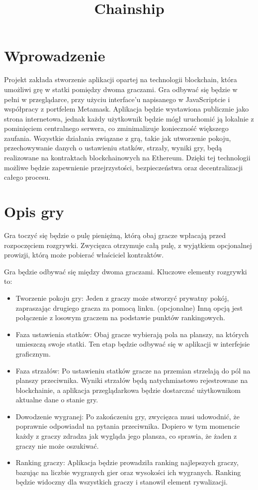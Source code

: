 \documentclass{article}
\title{Chainship}
\date{}
\begin{document}
\maketitle

\section{Wprowadzenie}

Projekt zakłada stworzenie aplikacji opartej na technologii blockchain, która umożliwi grę w statki pomiędzy dwoma graczami. Gra odbywać się będzie w pełni w przeglądarce, przy użyciu interface'u napisanego w JavaScriptcie i współpracy z portfelem Metamask. Aplikacja będzie wystawiona publicznie jako strona internetowa, jednak każdy użytkownik będzie mógł uruchomić ją lokalnie z pominięciem centralnego serwera, co zminimalizuje konieczność większego zaufania. Wszystkie działania związane z grą, takie jak utworzenie pokoju, przechowywanie danych o ustawieniu statków, strzały, wyniki gry, będą realizowane na kontraktach blockchainowych na Ethereum. Dzięki tej technologii możliwe będzie zapewnienie przejrzystości, bezpieczeństwa oraz decentralizacji całego procesu.

\section{Opis gry}

Gra toczyć się będzie o pulę pieniężną, którą obaj gracze wpłacają przed rozpoczęciem rozgrywki. Zwycięzca otrzymuje całą pulę, z wyjątkiem opcjonalnej prowizji, którą może pobierać właściciel kontraktów.

Gra będzie odbywać się między dwoma graczami. Kluczowe elementy rozgrywki to:
\begin{itemize}
    \item Tworzenie pokoju gry: Jeden z graczy może stworzyć prywatny pokój, zapraszając drugiego gracza za pomocą linku. (opcjonalne) Inną opcją jest połączenie z losowym graczem na podstawie punktów rankingowych.
    \item Faza ustawienia statków: Obaj gracze wybierają pola na planszy, na których umieszczą swoje statki. Ten etap będzie odbywać się w aplikacji w interfejsie graficznym.
    \item Faza strzałów: Po ustawieniu statków gracze na przemian strzelają do pól na planszy przeciwnika. Wyniki strzałów będą natychmiastowo rejestrowane na blockchainie, a aplikacja przeglądarkowa będzie dostarczać użytkownikom aktualne dane o stanie gry.
    \item Dowodzenie wygranej: Po zakończeniu gry, zwycięzca musi udowodnić, że poprawnie odpowiadał na pytania przeciwnika. Dopiero w tym momencie każdy z graczy zdradza jak wygląda jego plansza, co sprawia, że żaden z graczy nie może oszukiwać.
    \item Ranking graczy: Aplikacja będzie prowadziła ranking najlepszych graczy, bazując na liczbie wygranych gier oraz wysokości ich wygranych. Ranking będzie widoczny dla wszystkich graczy i stanowił element rywalizacji.
\end{itemize}
\end{document}
